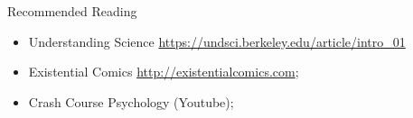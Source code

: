 \documentclass{beamer}
\begin{document}
\begin{CJK}{UTF8}{ipxm}
\begin{frame}{Recommended Reading}
  \begin{itemize}
    \item Understanding Science \url{https://undsci.berkeley.edu/article/intro_01}
    \item Existential Comics \url{http://existentialcomics.com};
    \item Crash Course Psychology (Youtube);
  \end{itemize}
\end{frame}


\end{CJK}
\end{document}
